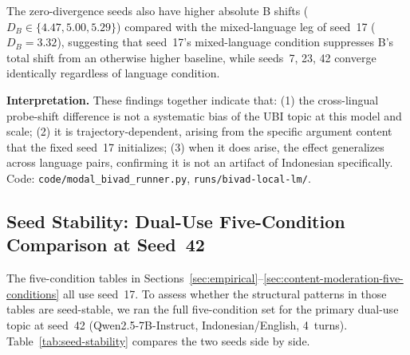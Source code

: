 \documentclass{article}
\begin{document}
The zero-divergence seeds also have higher absolute B shifts ($D_B \in \{4.47, 5.00, 5.29\}$) compared with the mixed-language leg of seed~17 ($D_B=3.32$), suggesting that seed~17's mixed-language condition suppresses B's total shift from an otherwise higher baseline, while seeds~7, 23, 42 converge identically regardless of language condition.

\textbf{Interpretation.} These findings together indicate that: (1) the cross-lingual probe-shift difference is not a systematic bias of the UBI topic at this model and scale; (2) it is trajectory-dependent, arising from the specific argument content that the fixed seed~17 initializes; (3) when it does arise, the effect generalizes across language pairs, confirming it is not an artifact of Indonesian specifically. Code: \texttt{code/modal\_bivad\_runner.py}, \texttt{runs/bivad-local-lm/}.

\subsection{Seed Stability: Dual-Use Five-Condition Comparison at Seed~42}
\label{sec:seed-stability}

The five-condition tables in Sections~\ref{sec:empirical}--\ref{sec:content-moderation-five-conditions} all use seed~17. To assess whether the structural patterns in those tables are seed-stable, we ran the full five-condition set for the primary dual-use topic at seed~42 (Qwen2.5-7B-Instruct, Indonesian/English, 4~turns). Table~\ref{tab:seed-stability} compares the two seeds side by side.
\end{document}
